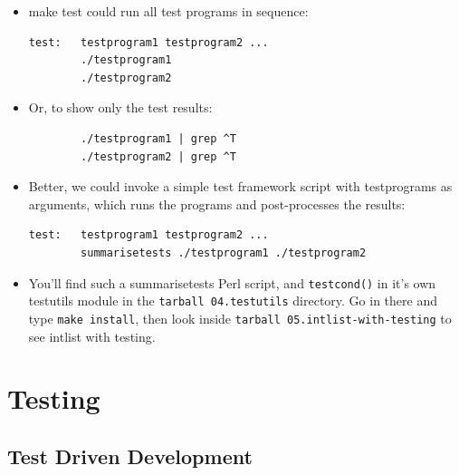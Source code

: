 \documentclass[handout]{beamer}
\newcommand{\pitem}{\pause \item}
\begin{document}
\begin{frame}[fragile]
    \begin{itemize}
      \item
      \alert{make test} could run all test programs in sequence:
\begin{verbatim}
test:   testprogram1 testprogram2 ...
        ./testprogram1
        ./testprogram2
\end{verbatim}

      \item
      Or, to show only the test results:
\begin{verbatim}
        ./testprogram1 | grep ^T
        ./testprogram2 | grep ^T
\end{verbatim}

      \pitem
      Better, we could invoke a simple
      test framework script with testprograms as arguments,
      which runs the programs and post-processes the results:

\begin{verbatim}
test:   testprogram1 testprogram2 ...
        summarisetests ./testprogram1 ./testprogram2
\end{verbatim}

      \item
      You'll find such a \alert{summarisetests} Perl script,
      and \verb+testcond()+ in it's own \alert{testutils} module
      in the \verb+tarball 04.testutils+ directory.  Go in there and type
      \verb+make install+, then look inside \verb+tarball 05.intlist-with-testing+ to see
      \alert{intlist} with testing.

    \end{itemize}
\end{frame}

\section{Testing}
\subsection{Test Driven Development}
\end{document}
